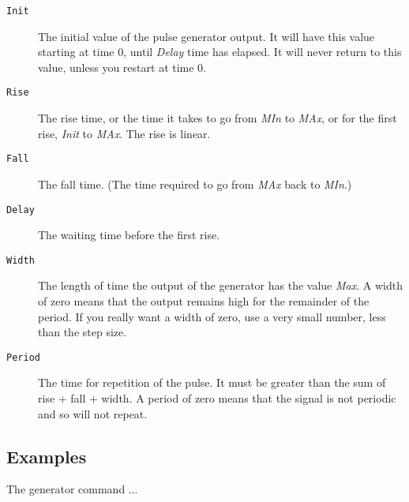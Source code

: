 \begin{description}
\item[{\tt Init}] The initial value of the pulse generator output.  It will
have this value starting at time 0, until {\it Delay} time has elapsed.  It
will never return to this value, unless you restart at time 0.

\item[{\tt Rise}] The rise time, or the time it takes to go from {\it MIn}
to {\it MAx}, or for the first rise, {\it Init} to {\it MAx}.  The rise is
linear.

\item[{\tt Fall}] The fall time.  (The time required to go from {\it MAx}
back to {\it MIn}.)

\item[{\tt Delay}] The waiting time before the first rise.

\item[{\tt Width}] The length of time the output of the generator has the
value {\it Max}.  A width of zero means that the output remains high for the
remainder of the period.  If you really want a width of zero, use a very
small number, less than the step size.

\item[{\tt Period}] The time for repetition of the pulse.  It must be
greater than the sum of rise + fall + width.  A period of zero means that
the signal is not periodic and so will not repeat.

\end{description}
\subsection{Examples}

The generator command ...

